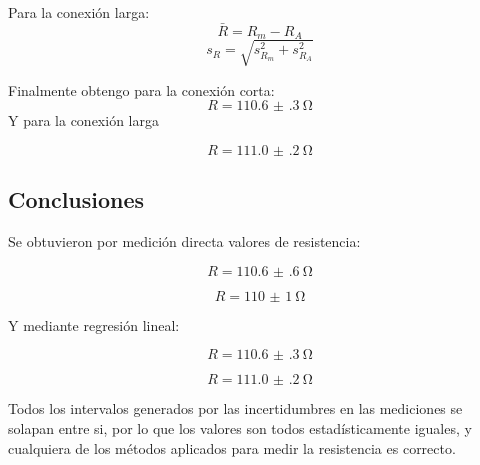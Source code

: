 \documentclass[12pt,a4paper]{article}
\begin{document}
Para la conexión larga:
$$\bar{R} = R_m - R_A$$
$$s_R = \sqrt{s_{R_m}^2 + s_{R_A}^2}$$


Finalmente obtengo para la conexión corta:
$$R = \SI{110.6(3)}{\ohm}$$
Y para la conexión larga

$$R = \SI{111.0(2)}{\ohm}$$

\subsection*{Conclusiones}

Se obtuvieron por medición directa valores de resistencia:

$$R = \SI{110.6(6)}{\ohm}$$

$$R = \SI{110(1)}{\ohm}$$

Y mediante regresión lineal:

$$R = \SI{110.6(3)}{\ohm}$$

$$R = \SI{111.0(2)}{\ohm}$$

Todos los intervalos generados por las incertidumbres en las mediciones se solapan entre si, por lo que los valores son todos estad\'isticamente iguales, y cualquiera de los métodos aplicados para medir la resistencia es correcto.
\end{document}
